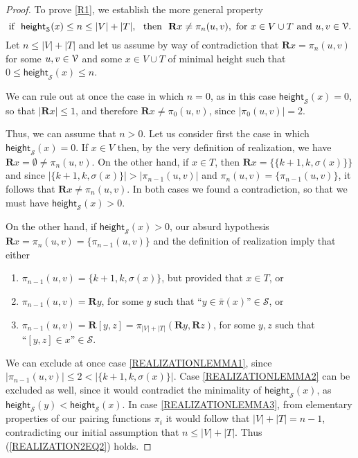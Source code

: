 \documentclass[a4paper,UKenglish]{lipics}
\newcommand{\nonpairs}[1]{\bar{\pi}(#1)}
\newcommand{\atset}{\mathcal{S}}
\newcommand{\vheight}{\mathsf{height}_{\atset}}
\newcommand{\aslit}[1]{\mbox{``}#1\mbox{''}}
\newcommand{\real}{\mathbf{R}}
\begin{document}
\begin{proof}
To prove \ref{R1}, we establish the more general property
\begin{equation}\label{REALIZATION2EQ2}
\text{if~ } \vheight(x) \leq n \leq |V|+|T| ,
\text{ ~then~ }
\real x  \neq \pi_n(u, v), \text{ for } x \in V \cup T
\text{ and } u, v \in \VNU.
\end{equation}
Let $n \leq |V|+|T|$ and let us assume by way of contradiction that
$\real x =\pi_n(u,v)$ for some $u,v \in \mathcal{V}$ and some $x \in V \cup
T$ of minimal height such that $0 \leq \vheight(x) \leq n$.

We can rule out at once the case in which $n=0$, as in this case
$\vheight(x) = 0$, so that $|\real x| \leq 1$, and therefore $\real x
\neq \pi_0(u,v)$, since $|\pi_0(u,v)| = 2$.

Thus, we can assume that $n>0$.  Let us consider first the case in
which $\vheight(x) = 0$.  If $x \in V$ then, by the very definition of
realization, we have $\real x = \emptyset \neq \pi_n(u,v)$.  On the
other hand, if $x \in T$, then $\real x = \{\{k+1,k,\sigma(x)\}\}$ and
since $|\{k+1,k,\sigma(x)\}| > |\pi_{n-1}(u,v)|$ and $\pi_n(u,v) =
\{\pi_{n-1}(u,v)\}$, it follows that $\real x \neq \pi_n(u,v)$.  In
both cases we found a contradiction, so that we must have $\vheight(x)
> 0$.

On the other hand, if $\vheight(x)>0$, our absurd hypothesis $\real x
= \pi_{n}(u,v) =\{ \pi_{n-1}(u,v) \}$ and the definition of realization imply that
either
\begin{enumerate}[label=\textbf{(\roman*)},leftmargin=23pt]
\item\label{REALIZATIONLEMMA1} $\pi_{n-1}(u,v)=\{k+1,k,\sigma(x)\}$,
but provided that $x \in T$, or

\item\label{REALIZATIONLEMMA2} $\pi_{n-1}(u,v)=\real y$,
for some $y$ such that $\aslit{y \in \nonpairs{x}} \in \atset$, or

\item\label{REALIZATIONLEMMA3} $\pi_{n-1}(u,v)=\real [y,z] =
\pi_{|V|+|T|} (\real y, \real z)$, for some $y,z$ such that
$\aslit{[y,z] \in x} \in \atset$.
\end{enumerate}
We can exclude at once case \ref{REALIZATIONLEMMA1}, since
$|\pi_{n-1}(u,v)|\leq 2 < |\{k+1,k,\sigma(x)\}|$.  Case
\ref{REALIZATIONLEMMA2} can be excluded as well, since it would
contradict the minimality of $\vheight(x)$, as $\vheight(y) <
\vheight(x)$.  In case \ref{REALIZATIONLEMMA3}, from elementary
properties of our pairing functions $\pi_{i}$ it would follow that
$|V|+|T|= n-1$, contradicting our initial assumption that $n \leq
|V|+|T|$.  Thus (\ref{REALIZATION2EQ2}) holds.


\end{proof}
\end{document}
